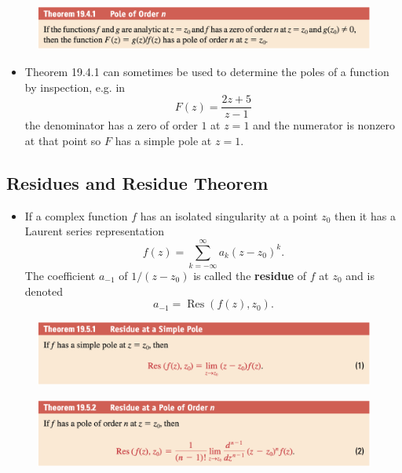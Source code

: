 \documentclass{article}
\newcommand{\Res}{\operatorname{Res}}
\begin{document}
\begin{figure}[H]
  \centering
  \includegraphics[width=\textwidth]{pole-of-order-n}
\end{figure}

\begin{itemize}
  \item Theorem 19.4.1 can sometimes be used to determine the poles of a function by inspection, e.g. in \[F(z) = \frac{2 z + 5}{z - 1}\] the denominator has a zero of order $1$ at $z = 1$ and the numerator is nonzero at that point so $F$ has a simple pole at $z = 1$.
\end{itemize}

\subsection{Residues and Residue Theorem}

\begin{itemize}
  \item If a complex function $f$ has an isolated singularity at a point $z_0$ then it has a Laurent series representation \[f(z) = \sum_{k = -\infty}^\infty a_k (z - z_0)^k.\] The coefficient $a_{-1}$ of $1 / (z - z_0)$ is called the \textbf{residue} of $f$ at $z_0$ and is denoted \[a_{-1} = \Res(f(z), z_0).\]
\end{itemize}

\begin{figure}[H]
  \centering
  \includegraphics[width=\textwidth]{residue-of-a-simple-pole}
\end{figure}

\begin{figure}[H]
  \centering
  \includegraphics[width=\textwidth]{residue-of-a-pole-of-order-n}
\end{figure}
\end{document}
